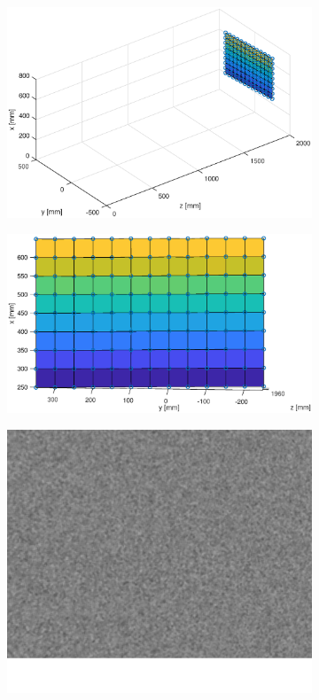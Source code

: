\begin{figure}[h!]
\begin{subfigure}[t]{0.20\linewidth}
	\end{subfigure}
	\begin{subfigure}[t]{0.20\linewidth}
		\centering
		\includegraphics[width=1\linewidth]{figures/part2/test1_scan}
	\end{subfigure}
	\begin{subfigure}[t]{0.20\linewidth}
		\centering
		\includegraphics[width=1\linewidth]{figures/part2/test1_scan1}
	\end{subfigure}
	\begin{subfigure}[t]{0.18\linewidth}
		\centering
		\includegraphics[width=0.8\linewidth]{figures/part2/test_left_2}

\end{subfigure}
\end{figure}
